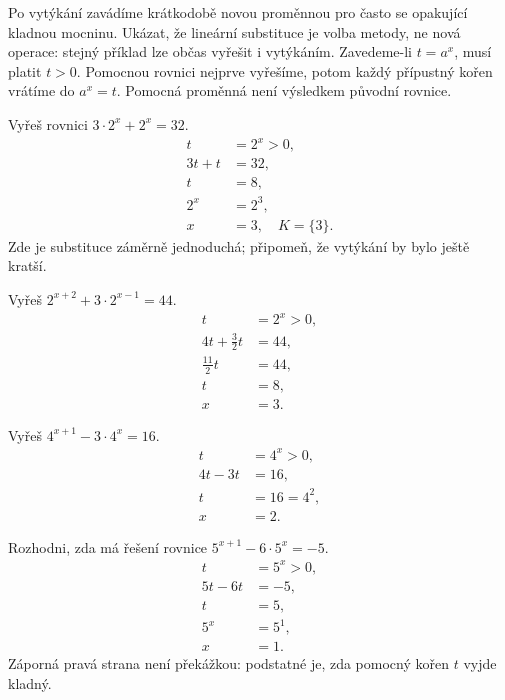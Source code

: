 \documentclass[11pt,a4paper]{article}
\begin{document}
Po vytýkání zavádíme krátkodobě novou proměnnou pro často se opakující kladnou mocninu. Ukázat, že lineární substituce je volba metody, ne nová operace: stejný příklad lze občas vyřešit i vytýkáním.
Zavedeme-li $t=a^x$, musí platit $t>0$. Pomocnou rovnici nejprve vyřešíme, potom každý přípustný kořen vrátíme do $a^x=t$. Pomocná proměnná není výsledkem původní rovnice.
\begin{prikladReseniBox}[title={Příklad 1}]
Vyřeš rovnici $3\cdot2^x+2^x=32$.
\tcblower
\[
\begin{aligned}t&=2^x>0,\\3t+t&=32,\\t&=8,\\2^x&=2^3,\\x&=3,\quad K=\{3\}.\end{aligned}
\]
Zde je substituce záměrně jednoduchá; připomeň, že vytýkání by bylo ještě kratší.
\end{prikladReseniBox}
\begin{prikladReseniBox}[title={Příklad 2}]
Vyřeš $2^{x+2}+3\cdot2^{x-1}=44$.
\tcblower
\[
\begin{aligned}t&=2^x>0,\\4t+\frac32t&=44,\\\frac{11}{2}t&=44,\\t&=8,\\x&=3.\end{aligned}
\]

\end{prikladReseniBox}
\begin{prikladReseniBox}[title={Příklad 3}]
Vyřeš $4^{x+1}-3\cdot4^x=16$.
\tcblower
\[
\begin{aligned}t&=4^x>0,\\4t-3t&=16,\\t&=16=4^2,\\x&=2.\end{aligned}
\]

\end{prikladReseniBox}
\begin{prikladReseniBox}[title={Příklad 4}]
Rozhodni, zda má řešení rovnice $5^{x+1}-6\cdot5^x=-5$.
\tcblower
\[
\begin{aligned}t&=5^x>0,\\5t-6t&=-5,\\t&=5,\\5^x&=5^1,\\x&=1.\end{aligned}
\]
Záporná pravá strana není překážkou: podstatné je, zda pomocný kořen $t$ vyjde kladný.
\end{prikladReseniBox}
\end{document}
